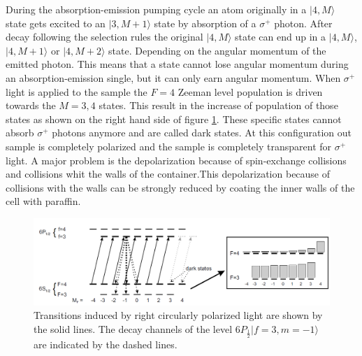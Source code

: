 \documentclass[a4paper,kul]{kulakarticle} %
\begin{document}
During the absorption-emission pumping cycle an atom originally in a $|4,M\rangle$ state gets excited to an $|3,M+1\rangle$ state by absorption of a $\sigma^{+}$ photon. After decay following the selection rules the original $|4,M\rangle$ state can end up in a $|4,M\rangle$, $|4,M+1\rangle$ or $|4,M+2\rangle$ state. Depending on the angular momentum of the emitted photon. This means that a state cannot lose angular momentum during an absorption-emission single, but it can only earn angular momentum. When $\sigma^{+}$ light is applied to the sample the $F=4$ Zeeman level population is driven towards the $M = 3,4$ states. This result in the increase of population of those states as shown on the right hand side of figure \ref{fig: transitions}. These specific states cannot absorb $\sigma^{+}$ photons anymore and are called dark states. At this configuration out sample is completely polarized and the sample is completely transparent for $\sigma^{+}$ light. A major problem is the depolarization because of spin-exchange collisions and collisions whit the walls of the container.This depolarization because of collisions with the walls can be strongly reduced by coating the inner walls of the cell with paraffin. 




\begin{figure}[h!]
	\centering
	\includegraphics[width=\linewidth]{transitions}
	\caption{Transitions induced by right circularly polarized light are shown by the solid lines. The decay channels of the level $6P_{\frac{1}{2}} |f=3,m=-1\rangle$ are indicated by the dashed lines.}
	\label{fig: transitions}
\end{figure}
\end{document}

